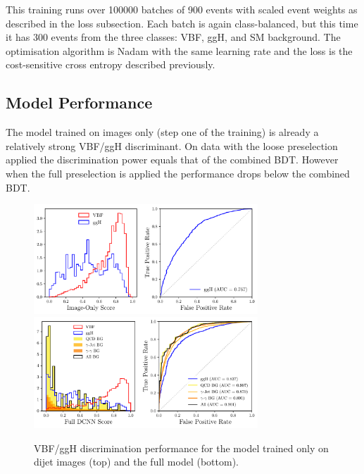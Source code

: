 This training runs over 100000 batches of 900 events with scaled event weights as described in the loss subsection. Each batch is again class-balanced, but this time it has 300 events from the three classes: VBF, ggH, and SM background. 
The optimisation algorithm is Nadam with the same learning rate and the loss is the cost-sensitive cross entropy described previously. 














\subsection{Model Performance}
The model trained on images only (step one of the training) is already a relatively strong VBF/ggH discriminant. 
On data with the loose preselection applied the discrimination power equals that of the combined BDT. 
However when the full preselection is applied the performance drops below the combined BDT. 
\begin{figure}[h!]
    \centering
    \includegraphics[width=0.75\textwidth]{figures/event_selection/imgonly_DCNN_PS.pdf}
    \includegraphics[width=0.75\textwidth]{figures/event_selection/full_DCNN_PS.pdf}
    \caption{VBF/ggH discrimination performance for the model trained only on dijet images (top) and the full model (bottom).}
    \label{fig:event_categorisation:image_only_DCNN}
\end{figure}

